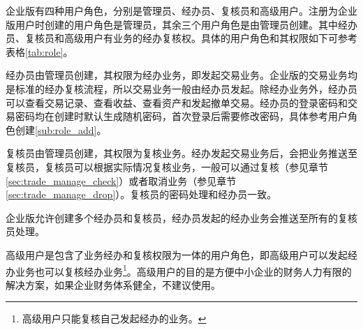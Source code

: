 企业版有四种用户角色，分别是管理员、经办员、复核员和高级用户。注册为企业版用户时创建的用户角色是管理员，其余三个用户角色是由管理员创建。其中经办员、复核员和高级用户有业务的经办复核权。具体的用户角色和其权限如下可参考表格\ref{tab:role}。 \par

经办员由管理员创建，其权限为经办业务，即发起交易业务。企业版的交易业务均是标准的经办复核流程，所以交易业务一般由经办员发起。除经办业务外，经办员可以查看交易记录、查看收益、查看资产和发起撤单交易。经办员的登录密码和交易密码均在创建时默认生成随机密码，首次登录后需要修改密码，具体参考用户角色创建\ref{sub:role_add}。\par

复核员由管理员创建，其权限为复核业务。经办发起交易业务后，会把业务推送至复核员，复核员可以根据实际情况复核业务，一般可以通过复核（参见章节\ref{sec:trade_manage_check}）或者取消业务（参见章节\ref{sec:trade_manage_drop}）。复核员的密码处理和经办员一致。\par

企业版允许创建多个经办员和复核员，经办员发起的经办业务会推送至所有的复核员处理。\par

高级用户是包含了业务经办和复核权限为一体的用户角色，即高级用户可以发起经办业务也可以复核经办业务\footnote{高级用户只能复核自己发起经办的业务。}。高级用户的目的是方便中小企业的财务人力有限的解决方案，如果企业财务体系健全，不建议使用。

